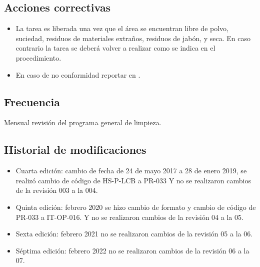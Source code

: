 \subsection{Acciones correctivas}

\begin{itemize}
	\item La tarea es liberada una vez que el área se encuentran libre de polvo, suciedad, residuos de materiales extraños, residuos de jabón, y seca. En caso contrario la tarea se deberá volver a realizar como se indica en el procedimiento.
	\item En caso de no conformidad reportar en \RAC.
\end{itemize}

\subsection{Frecuencia}

Mensual revisión del programa general de limpieza.

\subsection{Historial de modificaciones}

\begin{itemize}
	\item Cuarta edición: cambio de fecha de 24 de mayo 2017 a 28 de enero 2019, se realizó cambio de código de HS-P-LCB a PR-033 Y no se realizaron cambios de la revisión 003 a la 004.
	\item Quinta edición: febrero 2020 se hizo cambio de formato y cambio de código de PR-033 a IT-OP-016. Y no se realizaron cambios de la revisión 04 a la 05.
	\item Sexta edición: febrero 2021 no se realizaron cambios de la revisión 05 a la 06.
	\item Séptima edición: febrero 2022 no se realizaron cambios de la revisión 06 a la 07.
\end{itemize}
